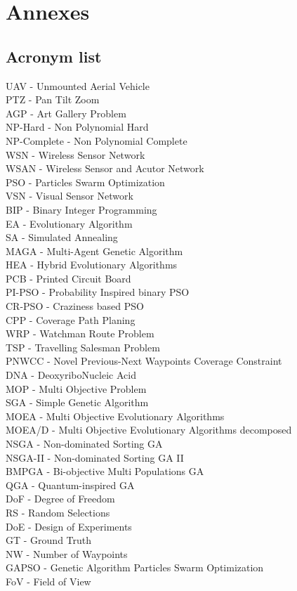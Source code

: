 \documentclass[english]{spimubphdthesis}
\begin{document}
\chapter{ Annexes}
\section{Acronym list}
UAV - Unmounted Aerial Vehicle \\
PTZ - Pan Tilt Zoom \\
AGP - Art Gallery Problem \\
NP-Hard - Non Polynomial Hard  \\ 
NP-Complete - Non Polynomial Complete  \\ 
WSN - Wireless Sensor Network \\
WSAN - Wireless Sensor and Acutor Network\\
PSO - Particles Swarm Optimization \\
VSN - Visual Sensor Network \\
BIP - Binary Integer Programming \\
EA - Evolutionary Algorithm \\
SA - Simulated Annealing \\
MAGA - Multi-Agent Genetic Algorithm \\
HEA - Hybrid Evolutionary Algorithms  \\
PCB - Printed Circuit Board  \\
PI-PSO  - Probability Inspired binary PSO \\
CR-PSO - Craziness based PSO  \\
CPP - Coverage Path Planing   \\
WRP - Watchman Route Problem \\ 
TSP - Travelling Salesman Problem \\ 
PNWCC - Novel Previous-Next Waypoints Coverage Constraint \\ 
DNA - DeoxyriboNucleic Acid \\
MOP - Multi Objective Problem \\
SGA - Simple Genetic Algorithm  \\
MOEA - Multi Objective Evolutionary Algorithms \\
MOEA/D - Multi Objective Evolutionary Algorithms  decomposed\\
NSGA - Non-dominated Sorting GA \\
NSGA-II - Non-dominated Sorting GA II \\
BMPGA - Bi-objective Multi Populations GA \\
QGA - Quantum-inspired GA \\
DoF - Degree of Freedom \\
RS - Random Selections \\
DoE - Design of Experiments \\
GT - Ground Truth \\
NW - Number of Waypoints \\
GAPSO -  Genetic Algorithm Particles Swarm Optimization  \\
FoV - Field of View \\
\end{document}
